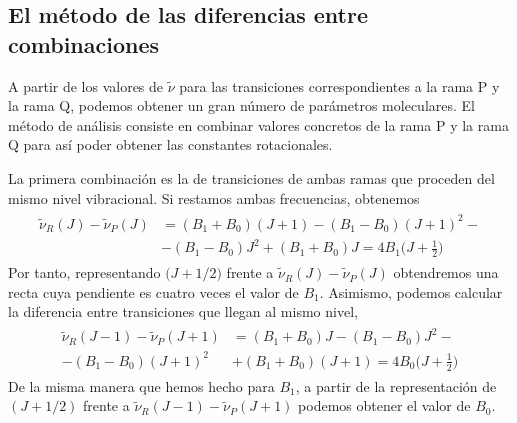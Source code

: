 \documentclass{tufte-book}
\begin{document}
\subsection{El método de las diferencias entre combinaciones}
A partir de los valores de $\tilde{\nu}$ para las transiciones
correspondientes a la rama P y la rama Q, podemos obtener un 
gran número de parámetros moleculares. El método de análisis
consiste en combinar valores concretos de la rama P y la
rama Q para así poder obtener las constantes rotacionales.

La primera combinación es la de transiciones de ambas ramas
que proceden del mismo nivel vibracional. Si restamos ambas
frecuencias, obtenemos
\begin{align}
\begin{split}
    \tilde{\nu}_R(J) - \tilde{\nu}_P(J)&=
    (B_1+B_0)(J+1) - (B_1-B_0)(J+1)^2 - \\
    &- (B_1-B_0)J^2 + (B_1 + B_0)J =4B_1\big(J+\frac{1}{2}\big)
\end{split}
\end{align}
Por tanto, representando $\big(J+1/2\big)$ frente a
$\tilde{\nu}_R(J) - \tilde{\nu}_P(J)$ obtendremos una
recta cuya pendiente es cuatro veces el valor de $B_1$.
Asimismo, podemos calcular la diferencia entre transiciones
que llegan al mismo nivel,
\begin{align}
    \begin{split}
    \tilde{\nu}_R(J-1) - \tilde{\nu}_P(J+1)&=
    (B_1+B_0)J - (B_1-B_0)J^2 - \\
    - (B_1-B_0)(J+1)^2 &+ (B_1 + B_0)(J+1) =4B_0\big(J+\frac{1}{2}\big)
    \end{split}
\end{align}
De la misma manera que hemos hecho para $B_1$,  a partir
de la representación de $(J+1/2)$ frente a $\tilde{\nu}_R(J-1) -
\tilde{\nu}_P(J+1)$ podemos obtener el valor de $B_0$.
\end{document}
